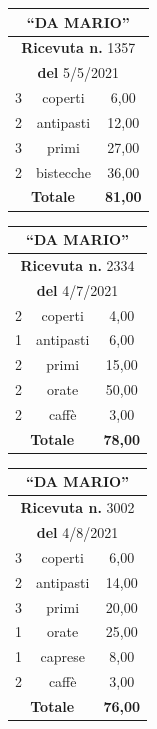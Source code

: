 \documentclass[12pt]{report}
\begin{document}
	\begin{center}

		\begin{tabular}{|c|c|c|}
			\hline
			\multicolumn{3}{|c|}{\textbf{``DA MARIO''}} \\
			\hline
			\multicolumn{3}{|c|}{\textbf{Ricevuta n.} 1357} \\
			\hline
			\multicolumn{3}{|c|}{\textbf{del} 5/5/2021} \\
			\hline
			3 & coperti & 6,00 \\
			2 & antipasti & 12,00 \\
			3 & primi & 27,00 \\
			2 & bistecche & 36,00 \\
			\hline
			\multicolumn{2}{|c|}{\textbf{Totale}} & \textbf{81,00} \\
			\hline
		\end{tabular}
		\hspace{1cm}
		\begin{tabular}{|c|c|c|}
			\hline
			\multicolumn{3}{|c|}{\textbf{``DA MARIO''}} \\
			\hline
			\multicolumn{3}{|c|}{\textbf{Ricevuta n.} 2334} \\
			\hline
			\multicolumn{3}{|c|}{\textbf{del} 4/7/2021} \\
			\hline
			2 & coperti & 4,00 \\
			1 & antipasti & 6,00 \\
			2 & primi & 15,00 \\
			2 & orate & 50,00 \\
			2 & caffè & 3,00 \\
			\hline
			\multicolumn{2}{|c|}{\textbf{Totale}} & \textbf{78,00} \\
			\hline
		\end{tabular}
		\hspace{1cm}
		\begin{tabular}{|c|c|c|}
			\hline
			\multicolumn{3}{|c|}{\textbf{``DA MARIO''}} \\
			\hline
			\multicolumn{3}{|c|}{\textbf{Ricevuta n.} 3002} \\
			\hline
			\multicolumn{3}{|c|}{\textbf{del} 4/8/2021} \\
			\hline
			3 & coperti & 6,00 \\
			2 & antipasti & 14,00 \\
			3 & primi & 20,00 \\
			1 & orate & 25,00 \\
			1 & caprese & 8,00 \\
			2 & caffè & 3,00 \\
			\hline
			\multicolumn{2}{|c|}{\textbf{Totale}} & \textbf{76,00} \\
			\hline
		\end{tabular}

	\end{center}
\end{document}
